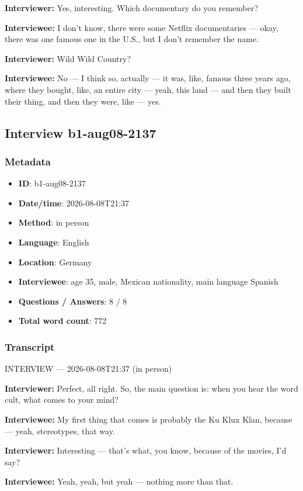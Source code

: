 \textbf{Interviewer:} Yes, interesting. Which documentary do you remember?

\textbf{Interviewee:} I don't know, there were some Netflix documentaries — okay, there was one famous one in the U.S., but I don't remember the name.

\textbf{Interviewer:} Wild Wild Country?

\textbf{Interviewee:} No — I think so, actually — it was, like, famous three years ago, where they bought, like, an entire city — yeah, this land — and then they built their thing, and then they were, like — yes.

\subsection{Interview b1-aug08-2137}\label{int:b1-aug08-2137}
\subsubsection*{Metadata}
\begin{itemize}
  \item \textbf{ID}: b1-aug08-2137
  \item \textbf{Date/time}: 2026-08-08T21:37
  \item \textbf{Method}: in person
  \item \textbf{Language}: English
  \item \textbf{Location}: Germany
  \item \textbf{Interviewee}: age 35, male, Mexican nationality, main language Spanish
  \item \textbf{Questions / Answers}: 8 / 8
  \item \textbf{Total word count}: 772
\end{itemize}
\subsubsection*{Transcript}
INTERVIEW — 2026-08-08T21:37 (in person)

\textbf{Interviewer:} Perfect, all right. So, the main question is: when you hear the word cult, what comes to your mind?

\textbf{Interviewee:} My first thing that comes is probably the Ku Klux Klan, because — yeah, stereotypes, that way.

\textbf{Interviewer:} Interesting — that's what, you know, because of the movies, I'd say?

\textbf{Interviewee:} Yeah, yeah, but yeah — nothing more than that.


